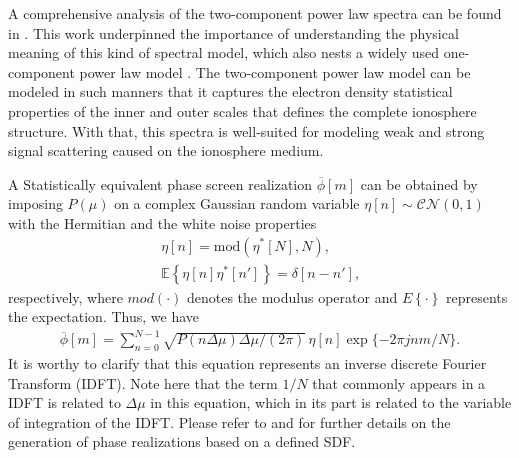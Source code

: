 A comprehensive analysis of the two-component power law spectra can be found in \cite{Carrano2016OverviewOfTwoComponentPowerLaw}. This work underpinned the importance of understanding the physical meaning of this kind of spectral model, which also nests a widely used one-component power law model \cite{CarranoBrazil2012}. The two-component power law model can be modeled in such manners that it captures the electron density statistical properties of the inner and outer scales that defines the complete ionosphere structure. With that, this spectra is well-suited for modeling weak and strong signal scattering caused on the ionosphere medium.

A Statistically equivalent phase screen realization $\overline{\phi}\left[ m \right]$ can be obtained by imposing $P\left( \mu \right)$ on a complex Gaussian random variable $\eta\left[ n \right] \sim \mathcal{C N}\left( 0, 1 \right)$ with the Hermitian and the white noise properties \cite{rinoCompactMultifrequencyGNSS2018}
\begin{align}
    \eta\left[ n \right] = \text{mod}\left( \eta^*\left[ N \right], N \right) \text{,} \\
    \mathbb{E}\left\{ \eta\left[ n \right] \eta^{*}\left[ n' \right] \right\} = \delta\left[ n-n' \right] \text{,}
\end{align}
respectively, where $mod\left( \cdot \right)$ denotes the modulus operator and $E\left\{ \cdot \right\}$ represents the expectation. Thus, we have
\begin{align}
    \label{eq:phase_screen_realization}
    \overline{\phi}\left[ m \right] = \sum_{n=0}^{N-1} \sqrt{P(n\Delta \mu) \Delta \mu / (2\pi)} \, \eta\left[ n \right] \exp\{-2 \pi j n m / N\} \text{.}
\end{align}
It is worthy to clarify that this equation represents an inverse discrete Fourier Transform (IDFT). Note here that the term $1/N$ that commonly appears in a IDFT is related to $\Delta \mu$ in this equation, which in its part is related to the variable of integration of the IDFT. Please refer to \cite[Section 6.1]{vasylyevModelingIonosphericScintillation2022} and \cite[Section 2.2.4]{rinoTheoryScintillationApplications2011} for further details on the generation of phase realizations based on a defined SDF.

